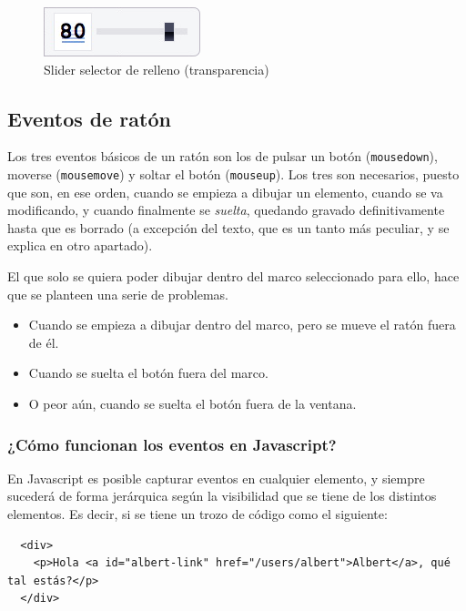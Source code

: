\begin{figure}[h!]
\centering
\includegraphics{fill_selector.png}
\caption{Slider selector de relleno (transparencia)}\label{fig:fill_selector}
\end{figure}




\subsection{Eventos de ratón} %
\label{sub:eventos_de_raton}

Los tres eventos básicos de un ratón son los de pulsar un botón (\texttt{mousedown}), moverse (\texttt{mousemove}) y soltar el botón (\texttt{mouseup}). Los tres son necesarios, puesto que son, en ese orden, cuando se empieza a dibujar un elemento, cuando se va modificando, y cuando finalmente se \emph{suelta}, quedando gravado definitivamente hasta que es borrado (a excepción del texto, que es un tanto más peculiar, y se explica en otro apartado).

El que solo se quiera poder dibujar dentro del marco seleccionado para ello, hace que se planteen una serie de problemas.

\begin{itemize}
  \item Cuando se empieza a dibujar dentro del marco, pero se mueve el ratón fuera de él.
  \item Cuando se suelta el botón fuera del marco.
  \item O peor aún, cuando se suelta el botón fuera de la ventana.
\end{itemize}

\subsubsection{¿Cómo funcionan los eventos en Javascript?} %
\label{ssub:como_funcionan_los_eventos}

En Javascript es posible capturar eventos en cualquier elemento, y siempre sucederá de forma jerárquica según la visibilidad que se tiene de los distintos elementos. Es decir, si se tiene un trozo de código como el siguiente:
\begin{verbatim}
  <div>
    <p>Hola <a id="albert-link" href="/users/albert">Albert</a>, qué tal estás?</p>
  </div>
\end{verbatim}

